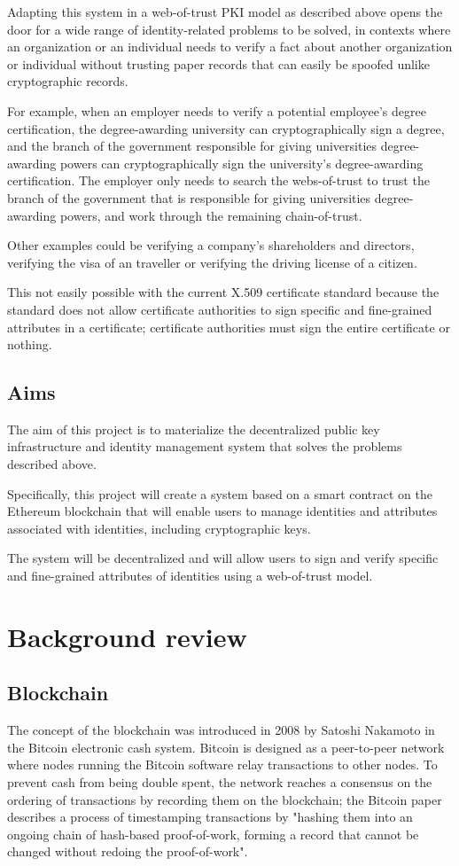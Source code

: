 \documentclass[12pt,a4paper]{report}
\begin{document}
	Adapting this system in a web-of-trust PKI model as described above opens the door for a wide range of identity-related problems to be solved, in contexts where an organization or an individual needs to verify a fact about another organization or individual without trusting paper records that can easily be spoofed unlike cryptographic records.
	
	For example, when an employer needs to verify a potential employee's degree certification, the degree-awarding university can cryptographically sign a degree, and the branch of the government responsible for giving universities degree-awarding powers can cryptographically sign the university's degree-awarding certification. The employer only needs to search the webs-of-trust to trust the branch of the government that is responsible for giving universities degree-awarding powers, and work through the remaining chain-of-trust.
	
	Other examples could be verifying a company's shareholders and directors, verifying the visa of an traveller or verifying the driving license of a citizen.
	
	This not easily possible with the current X.509 certificate standard because the standard does not allow certificate authorities to sign specific and fine-grained attributes in a certificate; certificate authorities must sign the entire certificate or nothing.
	
	
	\section{Aims}
	The aim of this project is to materialize the decentralized public key infrastructure and identity management system that solves the problems described above.
	
	Specifically, this project will create a system based on a smart contract on the Ethereum blockchain that will enable users to manage identities and attributes associated with identities, including cryptographic keys.
	
	The system will be decentralized and will allow users to sign and verify specific and fine-grained attributes of identities using a web-of-trust model.
	
	\chapter{Background review}
	\section{Blockchain}
	The	concept of the blockchain was introduced in 2008 by Satoshi Nakamoto in the Bitcoin electronic cash system.\cite{9} Bitcoin is designed as a peer-to-peer network where nodes running the Bitcoin software relay transactions to other nodes. To prevent cash from being double spent, the network reaches a consensus on the ordering of transactions by recording them on the blockchain; the Bitcoin paper describes a process of timestamping transactions by "hashing them into an ongoing chain of hash-based proof-of-work, forming a record that cannot be changed without redoing the proof-of-work".
	
\end{document}
